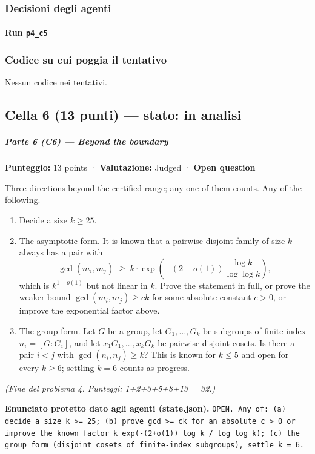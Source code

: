 \documentclass[11pt,a4paper]{article}
\begin{document}
\subsubsection{Decisioni degli agenti}
\paragraph{Run \texttt{p4\_c5}}

\subsubsection{Codice su cui poggia il tentativo}
Nessun codice nei tentativi.

\subsection{Cella 6 (13 punti) — stato: in analisi}
\subparagraph{Parte 6 (C6) --- Beyond the
boundary}\label{parte-6-c6-beyond-the-boundary}

\textbf{Punteggio:} 13 points · \textbf{Valutazione:} Judged ·
\textbf{Open question}

Three directions beyond the certified range; any one of them counts. Any
of the following.

\begin{enumerate}
\def\labelenumi{(\alph{enumi})}
\item
  Decide a size \(k \ge 25\).
\item
  The asymptotic form. It is known that a pairwise disjoint family of
  size \(k\) always has a pair with \[
  \gcd(m_i, m_j) \;\ge\; k \cdot \exp\!\left( -(2 + o(1)) \frac{\log k}{\log\log k} \right),
  \] which is \(k^{1 - o(1)}\) but not linear in \(k\). Prove the
  statement in full, or prove the weaker bound \(\gcd(m_i, m_j) \ge ck\)
  for some absolute constant \(c > 0\), or improve the exponential
  factor above.
\item
  The group form. Let \(G\) be a group, let \(G_1, \ldots, G_k\) be
  subgroups of finite index \(n_i = [G : G_i]\), and let
  \(x_1 G_1, \ldots, x_k G_k\) be pairwise disjoint cosets. Is there a
  pair \(i < j\) with \(\gcd(n_i, n_j) \ge k\)? This is known for
  \(k \le 5\) and open for every \(k \ge 6\); settling \(k = 6\) counts
  as progress.
\end{enumerate}

\emph{(Fine del problema 4. Punteggi: 1+2+3+5+8+13 = 32.)}

\textbf{Enunciato protetto dato agli agenti (state.json).} \texttt{OPEN. Any of: (a) decide a size k \textgreater{}= 25; (b) prove gcd \textgreater{}= ck for an absolute c \textgreater{} 0 or improve the known factor k exp(-(2+o(1)) log k / log log k); (c) the group form (disjoint cosets of finite-index subgroups), settle k = 6.}
\end{document}
